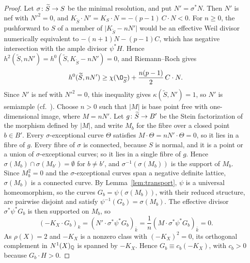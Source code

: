 \begin{proof}
Let $\sigma\colon\widetilde S\to S$ be the minimal resolution, and put $N' = \sigma^*N$.
Then $N'$ is nef with $N'^2 = 0$, and $K_{\widetilde S}\cdot N' = K_S\cdot N = -(p-1)\,C\cdot N<0$.
For $n\geq 0$, the pushforward to $S$ of a member of $\lvert K_{\widetilde S}-nN'\rvert$ would be an effective Weil divisor numerically equivalent to $-(n+1)N-(p-1)C$, which has negative intersection with the ample divisor $\psi^*H$.
Hence $h^2(\widetilde S,nN') = h^0(\widetilde S,K_{\widetilde S}-nN') = 0$, and Riemann--Roch gives
\[
  h^0(\widetilde S,nN')\geq\chi(\O_{\widetilde S})+\frac{n(p-1)}{2}\,C\cdot N.
\]
Since $N'$ is nef with $N'^2 = 0$, this inequality gives $\kappa(\widetilde S,N') = 1$, so $N'$ is semiample (cf.\ \cite[Lemma~2.7]{Tan20}).
Choose $n>0$ such that $\lvert M\rvert$ is base point free with one-dimensional image, where $M = nN'$.
Let $g\colon\widetilde S\to B'$ be the Stein factorization of the morphism defined by $\lvert M\rvert$, and write $M_b$ for the fibre over a closed point $b\in B'$.
Every $\sigma$-exceptional curve $\Theta$ satisfies $M\cdot\Theta = nN'\cdot\Theta = 0$, so it lies in a fibre of $g$.
Every fibre of $\sigma$ is connected, because $S$ is normal, and it is a point or a union of $\sigma$-exceptional curves; so it lies in a single fibre of $g$.
Hence $\sigma(M_b)\cap\sigma(M_{b'}) = \emptyset$ for $b\neq b'$, and $\sigma^{-1}(\sigma(M_b))$ is the support of $M_b$.
Since $M_b^2 = 0$ and the $\sigma$-exceptional curves span a negative definite lattice, $\sigma(M_b)$ is a connected curve.
By Lemma~\ref{lem:transport}, $\psi$ is a universal homeomorphism, so the curves $G_b = \psi(\sigma(M_b))$, with their reduced structure, are pairwise disjoint and satisfy $\psi^{-1}(G_b) = \sigma(M_b)$.
The effective divisor $\sigma^*\psi^*G_b$ is then supported on $M_b$, so
\[
  (-K_X\cdot G_b)_k = (N'\cdot\sigma^*\psi^*G_b)_{\bar k} = \frac{1}{n}(M\cdot\sigma^*\psi^*G_b)_{\bar k} = 0.
\]
As $\rho(X) = 2$ and $-K_X$ is a nonzero class with $(-K_X)^2 = 0$, its orthogonal complement in $N^1(X)_{\mathbb{Q}}$ is spanned by $-K_X$.
Hence $G_b\equiv c_b(-K_X)$, with $c_b>0$ because $G_b\cdot H>0$.


\end{proof}
